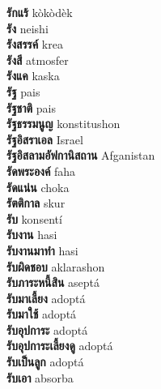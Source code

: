 \textbf{ รักแร้  } kòkòdèk \\
\textbf{ รัง  } neishi \\
\textbf{ รังสรรค์  } krea \\
\textbf{ รังสี  } atmosfer \\
\textbf{ รังแค  } kaska \\
\textbf{ รัฐ  } pais \\
\textbf{ รัฐชาติ  } pais \\
\textbf{ รัฐธรรมนูญ  } konstitushon \\
\textbf{ รัฐอิสราเอล  } Israel \\
\textbf{ รัฐอิสลามอัฟกานิสถาน  } Afganistan \\
\textbf{ รัดพระองค์  } faha \\
\textbf{ รัดแน่น  } choka \\
\textbf{ รัตติกาล  } skur \\
\textbf{ รับ  } konsentí \\
\textbf{ รับงาน  } hasi \\
\textbf{ รับงานมาทำ  } hasi \\
\textbf{ รับผิดชอบ  } aklarashon \\
\textbf{ รับภาระหนี้สิน  } aseptá \\
\textbf{ รับมาเลี้ยง  } adoptá \\
\textbf{ รับมาใช้  } adoptá \\
\textbf{ รับอุปการะ  } adoptá \\
\textbf{ รับอุปการะเลี้ยงดู  } adoptá \\
\textbf{ รับเป็นลูก  } adoptá \\
\textbf{ รับเอา  } absorba \\
